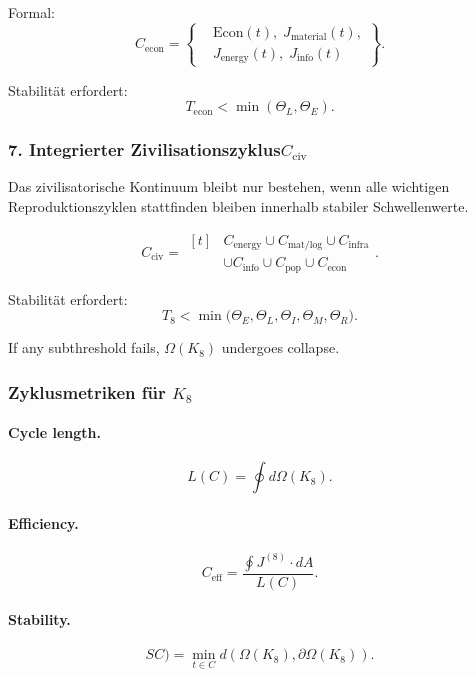 Formal:
\[
 C_{\mathrm{econ}}=
 \left\{
 \begin{aligned}
   &\mathrm{Econ}(t),\;
    J_{\mathrm{material}}(t),\\
   &J_{\mathrm{energy}}(t),\;
    J_{\mathrm{info}}(t)
 \end{aligned}
  \right\}.
\]

Stabilität erfordert:
\[
  T_{\mathrm{econ}} < \min(\Theta_L, \Theta_E).
\]

\subsubsection{7. Integrierter Zivilisationszyklus$C_{\mathrm{civ}}$}

Das zivilisatorische Kontinuum bleibt nur bestehen, wenn alle wichtigen Reproduktionszyklen stattfinden
bleiben innerhalb stabiler Schwellenwerte.

\[
 C_{\mathrm{civ}}
   = \begin{aligned}[t]
     &C_{\mathrm{energy}}
      \cup C_{\mathrm{mat/log}}
      \cup C_{\mathrm{infra}}\\
     &\cup C_{\mathrm{info}}
      \cup C_{\mathrm{pop}}
      \cup C_{\mathrm{econ}}
   \end{aligned}
   .
\]

Stabilität erfordert:
\[
T_8
   <
   \min\!\bigl(\Theta_E,\Theta_L,\Theta_I,\Theta_M,\Theta_R\bigr).
\]

If any subthreshold fails, $\Omega(K_8)$ undergoes collapse.

\subsubsection{Zyklusmetriken für \texorpdfstring{$K_8$}{K_8}}

\paragraph{Cycle length.}
\[
  L(C) = \oint d\Omega(K_8).
\]

\paragraph{Efficiency.}
\[
  C_{\mathrm{eff}}
  = \frac{\oint J^{(8)}\cdot dA}{L(C)}.
\]

\paragraph{Stability.}
\[
SC)
    = \min_{t\in C}
      d(\Omega(K_8),\partial\Omega(K_8)).
\]

